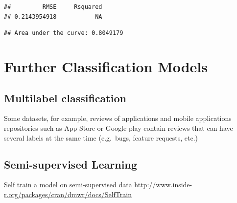 \documentclass[]{book}
\newenvironment{Shaded}{\begin{snugshade}}{\end{snugshade}}
\newcommand{\KeywordTok}[1]{\textcolor[rgb]{0.13,0.29,0.53}{\textbf{{#1}}}}
\newcommand{\DataTypeTok}[1]{\textcolor[rgb]{0.13,0.29,0.53}{{#1}}}
\newcommand{\DecValTok}[1]{\textcolor[rgb]{0.00,0.00,0.81}{{#1}}}
\newcommand{\FloatTok}[1]{\textcolor[rgb]{0.00,0.00,0.81}{{#1}}}
\newcommand{\StringTok}[1]{\textcolor[rgb]{0.31,0.60,0.02}{{#1}}}
\newcommand{\NormalTok}[1]{{#1}}
\begin{document}
\begin{verbatim}
##         RMSE     Rsquared 
## 0.2143954918           NA
\end{verbatim}

\begin{Shaded}
\end{Shaded}

\begin{verbatim}
## Area under the curve: 0.8049179
\end{verbatim}

\chapter{Further Classification
Models}\label{further-classification-models}

\section{Multilabel classification}\label{multilabel-classification}

Some datasets, for example, reviews of applications and mobile
applications repositories such as App Store or Google play contain
reviews that can have several labels at the same time (e.g.~bugs,
feature requests, etc.)

\section{Semi-supervised Learning}\label{semi-supervised-learning}

Self train a model on semi-supervised data
\url{http://www.inside-r.org/packages/cran/dmwr/docs/SelfTrain}

\begin{Shaded}
\end{Shaded}
\end{document}
